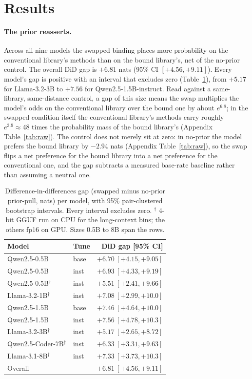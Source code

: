\documentclass[11pt]{article}
\begin{document}
\section{Results}
\label{sec:results}

\paragraph{The prior reasserts.} Across all nine models the swapped binding places more probability on the conventional library's methods than on the bound library's, net of the no-prior control. The overall DiD gap is $+6.81$ nats (95\% CI $[+4.56, +9.11]$). Every model's gap is positive with an interval that excludes zero (Table~\ref{tab:models}), from $+5.17$ for Llama-3.2-3B to $+7.56$ for Qwen2.5-1.5B-instruct. Read against a same-library, same-distance control, a gap of this size means the swap multiplies the model's odds on the conventional library over the bound one by about $e^{6.8}$; in the swapped condition itself the conventional library's methods carry roughly $e^{3.9}\approx 48$ times the probability mass of the bound library's (Appendix Table~\ref{tab:raw}). The control does not merely sit at zero: in no-prior the model prefers the bound library by $-2.94$ nats (Appendix Table~\ref{tab:raw}), so the swap flips a net preference for the bound library into a net preference for the conventional one, and the gap subtracts a measured base-rate baseline rather than assuming a neutral one.

\begin{table}[t]
\centering
\small
\begin{tabular}{llr}
\toprule
\textbf{Model} & \textbf{Tune} & \textbf{DiD gap [95\% CI]} \\
\midrule
Qwen2.5-0.5B            & base & $+6.70\ [+4.15, +9.05]$ \\
Qwen2.5-0.5B            & inst & $+6.93\ [+4.33, +9.19]$ \\
Qwen2.5-0.5B$^\dagger$  & inst & $+5.51\ [+2.41, +9.66]$ \\
Llama-3.2-1B$^\dagger$  & inst & $+7.08\ [+2.99, +10.0]$ \\
Qwen2.5-1.5B            & base & $+7.46\ [+4.64, +10.0]$ \\
Qwen2.5-1.5B            & inst & $+7.56\ [+4.78, +10.3]$ \\
Llama-3.2-3B$^\dagger$  & inst & $+5.17\ [+2.65, +8.72]$ \\
Qwen2.5-Coder-7B$^\dagger$ & inst & $+6.33\ [+3.31, +9.63]$ \\
Llama-3.1-8B$^\dagger$  & inst & $+7.33\ [+3.73, +10.3]$ \\
\midrule
Overall                 &      & $+6.81\ [+4.56, +9.11]$ \\
\bottomrule
\end{tabular}
\caption{Difference-in-differences gap (swapped minus no-prior prior-pull, nats) per model, with 95\% pair-clustered bootstrap intervals. Every interval excludes zero. $^\dagger$ 4-bit GGUF run on CPU for the long-context bins; the others fp16 on GPU. Sizes 0.5B to 8B span the rows.}
\label{tab:models}
\end{table}
\end{document}
